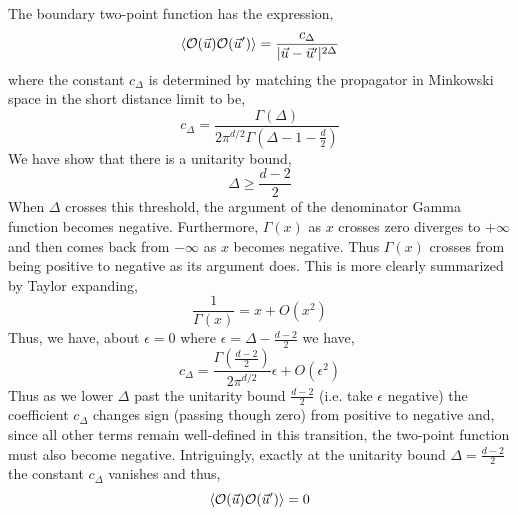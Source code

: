 \documentclass[12pt]{article}
\begin{document}
The boundary two-point function has the expression,
\[ \left< \mathcal{O}(\vec{u}) \mathcal{O}(\vec{u}') \right> = \frac{c_\Delta}{|\vec{u} - \vec{u}'|^{2 \Delta}} \]
where the constant $c_{\Delta}$ is determined by matching the propagator in Minkowski space in the short distance limit to be,
\[ c_\Delta = \frac{\Gamma(\Delta)}{2 \pi^{d / 2} \Gamma(\Delta - 1 - \tfrac{d}{2})} \]
We have show that there is a unitarity bound,
\[ \Delta \ge \frac{d - 2}{2} \]
When $\Delta$ crosses this threshold, the argument of the denominator Gamma function becomes negative. Furthermore, $\Gamma(x)$ as $x$ crosses zero diverges to $+ \infty$ and then comes back from $-\infty$ as $x$ becomes negative. Thus $\Gamma(x)$ crosses from being positive to negative as its argument does. This is more clearly summarized by Taylor expanding,
\[ \frac{1}{\Gamma(x)} = x + O(x^2) \]
Thus, we have, about $\epsilon = 0$ where $\epsilon = \Delta - \frac{d-2}{2}$ we have,
\[ c_\Delta = \frac{\Gamma\left( \tfrac{d-2}{2} \right)}{2 \pi^{d/2}} \epsilon + O(\epsilon^2) \]
Thus as we lower $\Delta$ past the unitarity bound $\frac{d-2}{2}$ (i.e. take $\epsilon$ negative) the coefficient $c_\Delta$ changes sign (passing though zero) from positive to negative and, since all other terms remain well-defined in this transition, the two-point function must also become negative. Intriguingly, exactly at the unitarity bound $\Delta = \frac{d-2}{2}$ the constant $c_{\Delta}$ vanishes and thus,
\[ \left< \mathcal{O}(\vec{u}) \mathcal{O}(\vec{u}') \right> = 0 \]

\subsection{}
\end{document}

